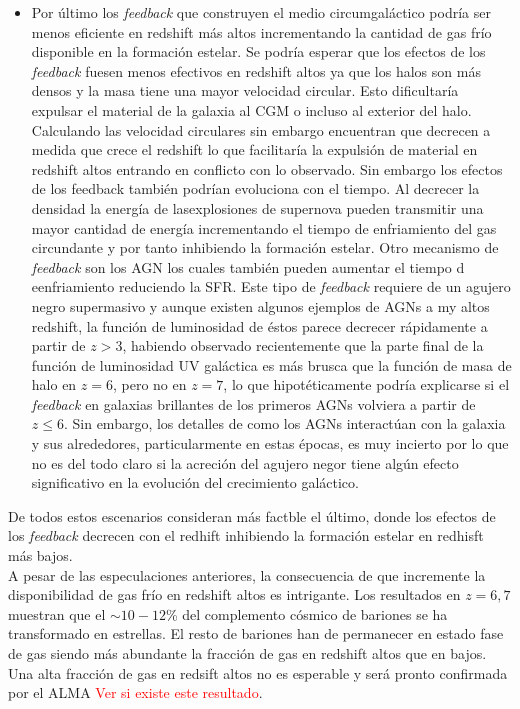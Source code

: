 \documentclass{article}
\begin{document}
\begin{itemize}
\item Por último los \textit{feedback} que construyen el medio circumgaláctico podría ser menos eficiente en redshift más altos incrementando la cantidad de gas frío disponible en la formación estelar. Se podría esperar que los efectos de los \textit{feedback} fuesen menos efectivos en redshift altos ya que los halos son más densos y la masa tiene una mayor velocidad circular. Esto dificultaría expulsar el material de la galaxia al CGM o incluso al exterior del halo. Calculando las velocidad circulares sin embargo encuentran que decrecen a medida que crece el redshift lo que facilitaría la expulsión de material en redshift altos entrando en conflicto con lo observado. Sin embargo los efectos de los feedback también podrían evoluciona con el tiempo. Al decrecer la densidad la energía de lasexplosiones de supernova pueden transmitir una mayor cantidad de energía incrementando el tiempo de enfriamiento del gas circundante y por tanto inhibiendo la formación estelar. Otro mecanismo de \textit{feedback} son los AGN los cuales también pueden aumentar el tiempo d eenfriamiento reduciendo la SFR. Este tipo de \textit{feedback} requiere de un agujero negro supermasivo y aunque existen algunos ejemplos de AGNs a my altos redshift, la función de luminosidad de éstos parece decrecer rápidamente a partir de $z>3$, habiendo observado recientemente que la parte final de la función de luminosidad UV galáctica es más brusca que la función de masa de halo en $z=6$, pero no en $z=7$, lo que hipotéticamente podría explicarse si el \textit{feedback} en galaxias brillantes de los primeros AGNs volviera a partir de $z\leq 6$. Sin embargo, los detalles de como los AGNs interactúan con la galaxia y sus alrededores, particularmente en estas épocas, es muy incierto por lo que no es del todo claro si la acreción del agujero negor tiene algún efecto significativo en la evolución del crecimiento galáctico.
\end{itemize}

De todos estos escenarios \cite{finkelstein2015increasing} consideran más factble el último, donde los efectos de los \textit{feedback} decrecen con el redhift inhibiendo la formación estelar en redhisft más bajos.\\

A pesar de las especulaciones anteriores, la consecuencia de que incremente la disponibilidad de gas frío en redshift altos es intrigante. Los resultados en $z=6,7$ muestran que el $\sim 10-12$\% del complemento cósmico de bariones se ha transformado en estrellas. El resto de bariones han de permanecer en estado fase de gas siendo más abundante la fracción de gas en redshift altos que en bajos. Una alta fracción de gas en redsift altos no es esperable y será pronto confirmada por el ALMA \textcolor{red}{Ver si existe este resultado}.\\
\end{document}
